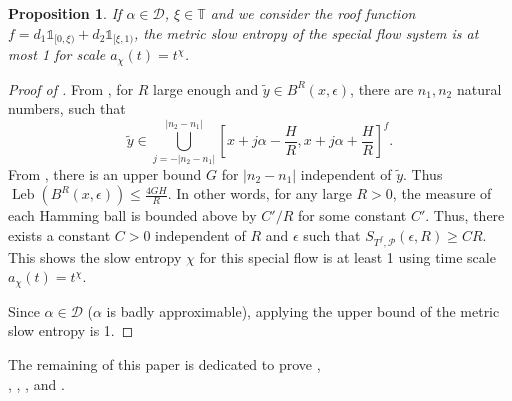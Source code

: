 \documentclass[oneside]{amsart}
\theoremstyle{plain}
\newtheorem{PROP}[THM]{Proposition}
\theoremstyle{definition}
\DeclareMathOperator{\Leb}{Leb}
\newcommand{\<}{\langle}
\renewcommand{\>}{\rangle}
\renewcommand{\P}{\mathcal{P}}
\newcommand{\e}{\epsilon}
\renewcommand{\|}{|\!|} %
\begin{document}
\begin{PROP}
\label{prop:loc-const-roof}
If $\alpha\in \mathcal{D}$,  \(\xi \in \mathbb{T}\) and we consider the roof function \(f=d_1\mathds{1}_{[0,\xi)}+d_2\mathds{1}_{[\xi,1)}\), the metric slow entropy of the special flow system is at most 1 for scale \(a_{\chi}(t)=t^{\chi}\). 
\end{PROP} 
 \begin{proof}[Proof of ]

From , for $R$ large enough and $\tilde{y}\in B^R(x,\e)$, there are $n_1,n_2$ natural numbers, such that
$$\tilde{y}\in\displaystyle\bigcup_{j=-|n_2-n_1|}^{|n_2-n_1|} \left[x+j\alpha-\frac{H}{R},x+j\alpha+\frac{H}{R}\right]^f.$$ 
From , there is an upper bound $G$ for $|n_2-n_1|$ independent of $\tilde{y}.$
Thus $\Leb(B^R(x,\e))\le \frac{4GH}{R}.$
In other words, for any large $R>0$, the measure of each Hamming ball is bounded above by $C'/R$ for some constant $C'$. Thus, there exists a constant $C>0$ independent of $R$ and $\e$ such that $S_{T^{f},\P}(\e,R)\geq CR$. This shows the slow entropy $\chi$ for this special flow is at least 1 using time scale $a_{\chi}(t)=t^{\chi}$. 

 Since $\alpha \in \mathcal{D}$ ($\alpha$ is badly approximable), applying  the upper bound of the metric slow entropy is 1.
\end{proof}

The remaining of this paper is dedicated to prove , \\
, 
, 
, 
and .
\end{document}
